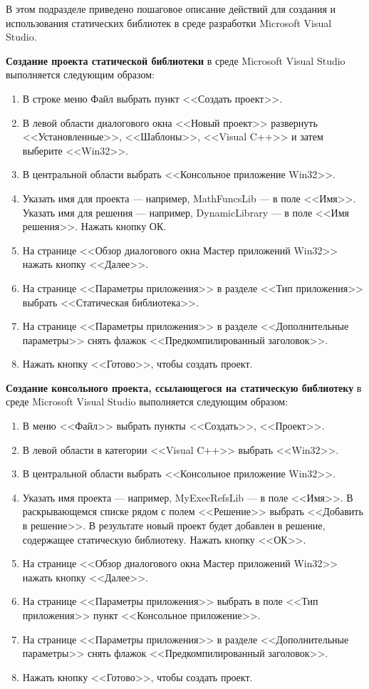 В этом подразделе приведено пошаговое описание действий для создания и использования
статических библиотек в среде разработки Microsoft Visual Studio.

\textbf{Создание проекта статической библиотеки} в среде
Microsoft Visual Studio выполняется следующим образом:

\begin{enumerate}
\item
  В строке меню Файл выбрать пункт <<Создать проект>>.
\item
  В левой области диалогового окна <<Новый проект>> развернуть
  <<Установленные>>, <<Шаблоны>>, <<Visual C++>> и затем выберите <<Win32>>.
\item
  В центральной области выбрать <<Консольное приложение Win32>>.
\item
  Указать имя для проекта --- например, MathFuncsLib --- в поле <<Имя>>.
  Указать имя для решения --- например, DynamicLibrary --- в поле <<Имя решения>>.
  Нажать кнопку ОК.
\item
  На странице <<Обзор диалогового окна Мастер приложений Win32>> нажать кнопку <<Далее>>.
\item
  На странице <<Параметры приложения>> в разделе <<Тип приложения>>
  выбрать <<Статическая библиотека>>.
\item
  На странице <<Параметры приложения>> в разделе <<Дополнительные параметры>>
  снять флажок <<Предкомпилированный заголовок>>.
\item
  Нажать кнопку <<Готово>>, чтобы создать проект.
\end{enumerate}

\textbf{Создание консольного проекта, ссылающегося на статическую библиотеку} в среде
Microsoft Visual Studio выполняется следующим образом:

\begin{enumerate}
\item
  В меню <<Файл>> выбрать пункты <<Создать>>, <<Проект>>.
\item
  В левой области в категории <<Visual C++>> выбрать <<Win32>>.
\item
  В центральной области выбрать <<Консольное приложение Win32>>.
\item
  Указать имя проекта --- например, MyExecRefsLib --- в поле <<Имя>>.
  В раскрывающемся списке рядом с полем <<Решение>> выбрать <<Добавить в решение>>.
  В результате новый проект будет добавлен в решение, содержащее статическую библиотеку.
  Нажать кнопку <<ОК>>.
\item
  На странице <<Обзор диалогового окна Мастер приложений Win32>> нажать кнопку <<Далее>>.
\item
  На странице <<Параметры приложения>> выбрать в поле <<Тип приложения>> пункт
  <<Консольное приложение>>.
\item
  На странице <<Параметры приложения>> в разделе <<Дополнительные параметры>>
  снять флажок <<Предкомпилированный заголовок>>.
\item
  Нажать кнопку <<Готово>>, чтобы создать проект.
\end{enumerate}

